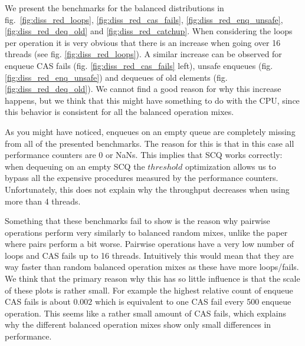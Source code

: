 \documentclass{article}      %
\begin{document}
We present the benchmarks for the balanced distributions in fig.\ \ref{fig:diss_red_loops}, \ref{fig:diss_red_cas_fails}, \ref{fig:diss_red_enq_unsafe}, \ref{fig:diss_red_deq_old} and \ref{fig:diss_red_catchup}. When considering the loops per operation it is very obvious that there is an increase when going over 16 threads (see fig. \ref{fig:diss_red_loops}). A similar increase can be observed for enqueue CAS fails (fig. \ref{fig:diss_red_cas_fails} left), unsafe enqueues (fig. \ref{fig:diss_red_enq_unsafe}) and dequeues of old elements (fig. \ref{fig:diss_red_deq_old}). We cannot find a good reason for why this increase happens, but we think that this might have something to do with the CPU, since this behavior is consistent for all the balanced operation mixes.

As you might have noticed, enqueues on an empty queue are completely missing from all of the presented benchmarks. The reason for this is that in this case all performance counters are 0 or NaNs. This implies that SCQ works correctly: when dequeuing on an empty SCQ the $threshold$ optimization allows us to bypass all the expensive procedures measured by the performance counters. Unfortunately, this does not explain why the throughput decreases when using more than 4 threads.


Something that these benchmarks fail to show is the reason why  pairwise operations perform very similarly to balanced random mixes, unlike the paper where pairs perform a bit worse.  Pairwise operations have a very low number of loops and CAS fails up to 16 threads. Intuitively this would mean that they are way faster than random balanced operation mixes as these have more loops/fails. We think that the primary reason why this has so little influence is that the scale of these plots is rather small. For example the highest relative count of enqueue CAS fails is about $0.002$ which is equivalent to one CAS fail every 500 enqueue operation. This seems like a rather small amount of CAS fails, which explains why the different balanced operation mixes show only small differences in performance.
\end{document}
